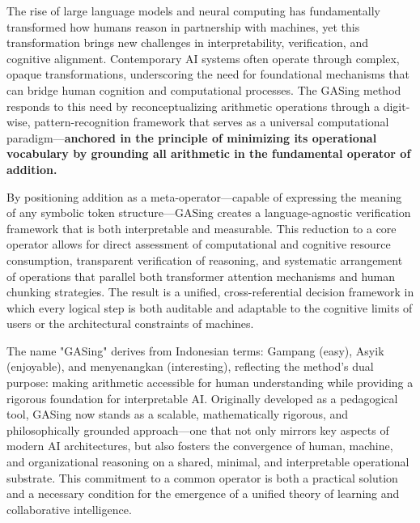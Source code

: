 The rise of large language models and neural computing has fundamentally transformed how humans reason in partnership with machines, yet this transformation brings new challenges in interpretability, verification, and cognitive alignment. Contemporary AI systems often operate through complex, opaque transformations, underscoring the need for foundational mechanisms that can bridge human cognition and computational processes. The GASing method responds to this need by reconceptualizing arithmetic operations through a digit-wise, pattern-recognition framework that serves as a universal computational paradigm—\textbf{anchored in the principle of minimizing its operational vocabulary by grounding all arithmetic in the fundamental operator of addition.}

By positioning addition as a meta-operator—capable of expressing the meaning of any symbolic token structure—GASing creates a language-agnostic verification framework that is both interpretable and measurable. This reduction to a core operator allows for direct assessment of computational and cognitive resource consumption, transparent verification of reasoning, and systematic arrangement of operations that parallel both transformer attention mechanisms and human chunking strategies. The result is a unified, cross-referential decision framework in which every logical step is both auditable and adaptable to the cognitive limits of users or the architectural constraints of machines.

The name "GASing" derives from Indonesian terms: Gampang (easy), Asyik (enjoyable), and menyenangkan (interesting), reflecting the method’s dual purpose: making arithmetic accessible for human understanding while providing a rigorous foundation for interpretable AI. Originally developed as a pedagogical tool, GASing now stands as a scalable, mathematically rigorous, and philosophically grounded approach—one that not only mirrors key aspects of modern AI architectures, but also fosters the convergence of human, machine, and organizational reasoning on a shared, minimal, and interpretable operational substrate. This commitment to a common operator is both a practical solution and a necessary condition for the emergence of a unified theory of learning and collaborative intelligence.
